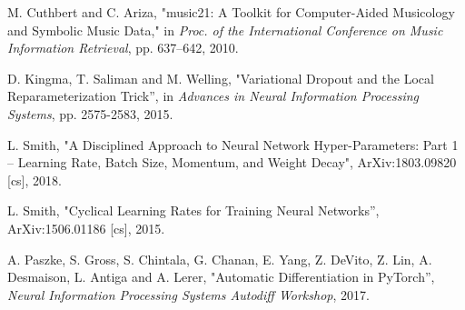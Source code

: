 \documentclass{article}
\begin{document}
\begin{thebibliography}{citations}
M. Cuthbert and C. Ariza, "music21: A Toolkit for Computer-Aided Musicology and Symbolic Music Data," in {\em Proc. of the International Conference on Music Information Retrieval}, pp. 637–642, 2010.

D. Kingma, T. Saliman and M. Welling, "Variational Dropout and the Local Reparameterization Trick”, in {\em Advances in Neural Information Processing Systems}, pp. 2575-2583, 2015.

L. Smith, "A Disciplined Approach to Neural Network Hyper-Parameters: Part 1 – Learning Rate, Batch Size, Momentum, and Weight Decay", ArXiv:1803.09820 [cs],  2018.

L. Smith, "Cyclical Learning Rates for Training Neural Networks”, ArXiv:1506.01186 [cs],  2015.

A. Paszke, S. Gross, S. Chintala, G. Chanan, E. Yang, Z. DeVito, Z. Lin, A. Desmaison, L. Antiga and A. Lerer, "Automatic Differentiation in PyTorch”, {\em Neural Information Processing Systems Autodiff Workshop}, 2017.

\end{thebibliography}
\end{document}
